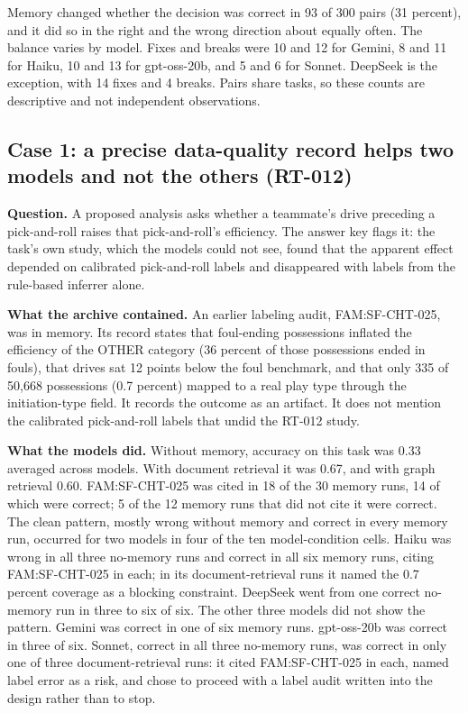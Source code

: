 \documentclass[11pt]{article}
\begin{document}
Memory changed whether the decision was correct in 93 of 300 pairs (31 percent), and it did so in the right and the wrong direction about equally often. The balance varies by model. Fixes and breaks were 10 and 12 for Gemini, 8 and 11 for Haiku, 10 and 13 for gpt-oss-20b, and 5 and 6 for Sonnet. DeepSeek is the exception, with 14 fixes and 4 breaks. Pairs share tasks, so these counts are descriptive and not independent observations.

\subsection{Case 1: a precise data-quality record helps two models and not the others (RT-012)}
\label{sec:rt012}

\textbf{Question.} A proposed analysis asks whether a teammate's drive preceding a pick-and-roll raises that pick-and-roll's efficiency. The answer key flags it: the task's own study, which the models could not see, found that the apparent effect depended on calibrated pick-and-roll labels and disappeared with labels from the rule-based inferrer alone.

\textbf{What the archive contained.} An earlier labeling audit, FAM:SF-CHT-025, was in memory. Its record states that foul-ending possessions inflated the efficiency of the OTHER category (36 percent of those possessions ended in fouls), that drives sat 12 points below the foul benchmark, and that only 335 of 50,668 possessions (0.7 percent) mapped to a real play type through the initiation-type field. It records the outcome as an artifact. It does not mention the calibrated pick-and-roll labels that undid the RT-012 study.

\textbf{What the models did.} Without memory, accuracy on this task was 0.33 averaged across models. With document retrieval it was 0.67, and with graph retrieval 0.60. FAM:SF-CHT-025 was cited in 18 of the 30 memory runs, 14 of which were correct; 5 of the 12 memory runs that did not cite it were correct. The clean pattern, mostly wrong without memory and correct in every memory run, occurred for two models in four of the ten model-condition cells. Haiku was wrong in all three no-memory runs and correct in all six memory runs, citing FAM:SF-CHT-025 in each; in its document-retrieval runs it named the 0.7 percent coverage as a blocking constraint. DeepSeek went from one correct no-memory run in three to six of six. The other three models did not show the pattern. Gemini was correct in one of six memory runs. gpt-oss-20b was correct in three of six. Sonnet, correct in all three no-memory runs, was correct in only one of three document-retrieval runs: it cited FAM:SF-CHT-025 in each, named label error as a risk, and chose to proceed with a label audit written into the design rather than to stop.
\end{document}
